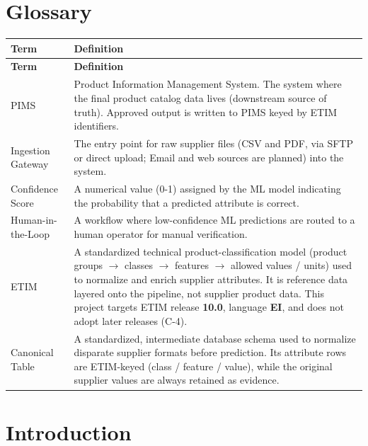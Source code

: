 \documentclass[12pt, a4paper]{article}
\begin{document}
\section*{Glossary}
\begin{longtable}{@{}l >{\raggedright\arraybackslash}p{12cm}@{}}
\toprule
\textbf{Term} & \textbf{Definition} \\
\midrule
\endfirsthead
\toprule
\textbf{Term} & \textbf{Definition} \\
\midrule
\endhead
\bottomrule
\endfoot
\bottomrule
\endlastfoot
PIMS & Product Information Management System. The system where the final product catalog data lives (downstream source of truth). Approved output is written to PIMS keyed by ETIM identifiers. \\
\addlinespace
Ingestion Gateway & The entry point for raw supplier files (CSV and PDF, via SFTP or direct upload; Email and web sources are planned) into the system. \\
\addlinespace
Confidence Score & A numerical value (0-1) assigned by the ML model indicating the probability that a predicted attribute is correct. \\
\addlinespace
Human-in-the-Loop & A workflow where low-confidence ML predictions are routed to a human operator for manual verification. \\
\addlinespace
ETIM & A standardized technical product-classification model (product groups $\rightarrow$ classes $\rightarrow$ features $\rightarrow$ allowed values / units) used to normalize and enrich supplier attributes. It is reference data layered onto the pipeline, not supplier product data. This project targets ETIM release \textbf{10.0}, language \textbf{EI}, and does not adopt later releases (C-4). \\
\addlinespace
Canonical Table & A standardized, intermediate database schema used to normalize disparate supplier formats before prediction. Its attribute rows are ETIM-keyed (class / feature / value), while the original supplier values are always retained as evidence. \\
\end{longtable}
\newpage


\section{Introduction}
\end{document}
